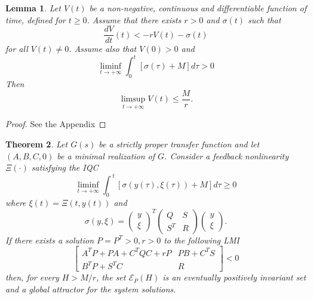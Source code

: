 \documentclass[letterpaper,10pt,conference,twocolumn]{IEEEtran}
\newtheorem{thm}{Theorem}[section]
\newtheorem{lem}[thm]{Lemma}
\newcommand{\Csi}{\Xi}
\newcommand{\ellips}{\mathcal{E}}
\begin{document}
\begin{lem}\label{lem:Vlimsupbounded}
	Let $V(t)$ be a non-negative, continuous and differentiable function of time,
	defined for $t\geq 0$.
	Assume that there exists $r>0$ and $\sigma(t)$ such that
	\begin{equation}\label{eq:diffV_lem_lim}
		\frac{dV}{dt}(t)<-r V(t)-\sigma(t)
	\end{equation}
	for all $V(t)\neq 0$. Assume also that $V(0)>0$ and
	\begin{equation*}
		\liminf_{t\rightarrow +\infty} \int_0^{t}[\sigma(\tau)+M]d\tau> 0
	\end{equation*}
	Then 
	\begin{equation*}
		\limsup_{t\rightarrow +\infty} V(t)\leq \frac{M}{r}.
	\end{equation*}	
\end{lem}
\begin{proof} See the Appendix
\end{proof}
\begin{thm}
	Let $G(s)$ be a strictly proper transfer function and let $(A,B,C,0)$ be
	a minimal realization of $G$. Consider a feedback nonlinearity $\Csi(\cdot)$
	satisfying the IQC
	\begin{equation}\nonumber
		\liminf_{t\rightarrow +\infty}
			\int_0^{~t}[\sigma(y(\tau),\xi(\tau)) + M ]d\tau\geq 0
	\end{equation}
	where $\xi(t)=\Xi(t,y(t))$ and
	\begin{equation}\nonumber
		\sigma(y,\xi)=
			\left(
				\begin{array}{c}
					y \\
					\xi
				\end{array}
			\right)^T
			\left(
				\begin{array}{cc}
					Q	& S \\
					S^T	& R
				\end{array}
			\right)
			\left(
				\begin{array}{c}
					y \\
					\xi
				\end{array}
			\right).
	\end{equation}
	If there exists a solution $P=P^T>0, r>0$ to the following LMI
	\begin{equation}\nonumber
		\left[
			\begin{array}{cc}
				A^TP+PA+C^TQC+rP	& PB+C^TS \\
				B^TP+S^TC		& R
			\end{array}
		\right] < 0
	\end{equation}
	then, for every $H>M/r$, the set $\ellips_P(H)$ is an eventually
	positively invariant set and a global attractor for the system solutions.	
\end{thm}
\end{document}
